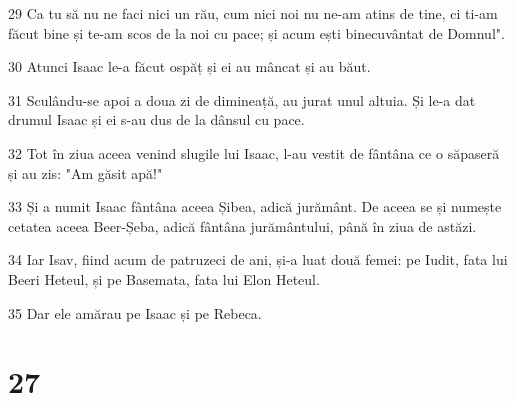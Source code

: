 \par 29 Ca tu să nu ne faci nici un rău, cum nici noi nu ne-am atins de tine, ci ti-am făcut bine și te-am scos de la noi cu pace; și acum ești binecuvântat de Domnul".
\par 30 Atunci Isaac le-a făcut ospăț și ei au mâncat și au băut.
\par 31 Sculându-se apoi a doua zi de dimineață, au jurat unul altuia. Și le-a dat drumul Isaac și ei s-au dus de la dânsul cu pace.
\par 32 Tot în ziua aceea venind slugile lui Isaac, l-au vestit de fântâna ce o săpaseră și au zis: "Am găsit apă!"
\par 33 Și a numit Isaac fântâna aceea Șibea, adică jurământ. De aceea se și numește cetatea aceea Beer-Șeba, adică fântâna jurământului, până în ziua de astăzi.
\par 34 Iar Isav, fiind acum de patruzeci de ani, și-a luat două femei: pe Iudit, fata lui Beeri Heteul, și pe Basemata, fata lui Elon Heteul.
\par 35 Dar ele amărau pe Isaac și pe Rebeca.

\chapter{27}

